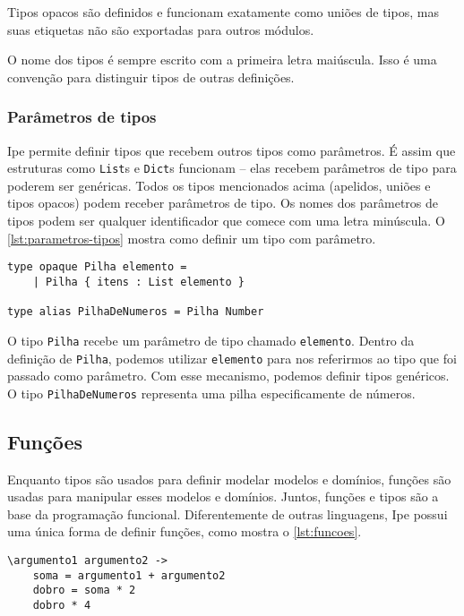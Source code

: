 Tipos opacos são definidos e funcionam exatamente como uniões de tipos, mas suas
etiquetas não são exportadas para outros módulos.

O nome dos tipos é sempre escrito com a primeira letra maiúscula. Isso é uma convenção
para distinguir tipos de outras definições.

\subsubsection{Parâmetros de tipos}

Ipe permite definir tipos que recebem outros tipos como parâmetros. É assim que
estruturas como \texttt{List}s e \texttt{Dict}s funcionam -- elas recebem parâmetros
de tipo para poderem ser genéricas. Todos os tipos mencionados acima (apelidos,
uniões e tipos opacos) podem receber parâmetros de tipo. Os nomes dos parâmetros
de tipos podem ser qualquer identificador que comece com uma letra minúscula. O
\autoref{lst:parametros-tipos} mostra como definir um tipo com parâmetro.

\begin{lstlisting}[label={lst:parametros-tipos},caption={Exemplo de como definir um tipo com parâmetro}]
type opaque Pilha elemento =
    | Pilha { itens : List elemento }

type alias PilhaDeNumeros = Pilha Number
\end{lstlisting}

O tipo \texttt{Pilha} recebe um parâmetro de tipo chamado \texttt{elemento}. Dentro
da definição de \texttt{Pilha}, podemos utilizar \texttt{elemento} para nos referirmos
ao tipo que foi passado como parâmetro. Com esse mecanismo, podemos definir tipos
genéricos. O tipo \texttt{PilhaDeNumeros} representa uma pilha especificamente de
números.

\subsection{Funções}

Enquanto tipos são usados para definir modelar modelos e domínios, funções são
usadas para manipular esses modelos e domínios. Juntos, funções e tipos são a
base da programação funcional. Diferentemente de outras linguagens, Ipe possui
uma única forma de definir funções, como mostra o \autoref{lst:funcoes}.

\begin{lstlisting}[label={lst:funcoes},caption={Exemplo de como definir uma função}]
\argumento1 argumento2 ->
    soma = argumento1 + argumento2
    dobro = soma * 2
    dobro * 4
\end{lstlisting}

